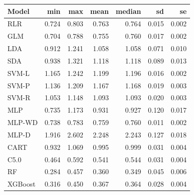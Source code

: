 \documentclass[
]{article}
\newenvironment{Shaded}{\begin{snugshade}}{\end{snugshade}}
\newcommand{\AttributeTok}[1]{\textcolor[rgb]{0.77,0.63,0.00}{#1}}
\newcommand{\DecValTok}[1]{\textcolor[rgb]{0.00,0.00,0.81}{#1}}
\newcommand{\FunctionTok}[1]{\textcolor[rgb]{0.00,0.00,0.00}{#1}}
\newcommand{\NormalTok}[1]{#1}
\newcommand{\OtherTok}[1]{\textcolor[rgb]{0.56,0.35,0.01}{#1}}
\newcommand{\SpecialCharTok}[1]{\textcolor[rgb]{0.00,0.00,0.00}{#1}}
\newcommand{\StringTok}[1]{\textcolor[rgb]{0.31,0.60,0.02}{#1}}
\begin{document}
\begin{Shaded}
\end{Shaded}

\begin{longtable}[]{@{}lrrrrrr@{}}
\toprule()
Model & min & max & mean & median & sd & se \\
\midrule()
\endhead
RLR & 0.724 & 0.803 & 0.763 & 0.764 & 0.015 & 0.002 \\
GLM & 0.704 & 0.788 & 0.755 & 0.760 & 0.017 & 0.002 \\
LDA & 0.912 & 1.241 & 1.058 & 1.058 & 0.071 & 0.010 \\
SDA & 0.938 & 1.321 & 1.118 & 1.118 & 0.089 & 0.013 \\
SVM-L & 1.165 & 1.242 & 1.199 & 1.196 & 0.016 & 0.002 \\
SVM-P & 1.136 & 1.209 & 1.167 & 1.168 & 0.019 & 0.003 \\
SVM-R & 1.053 & 1.148 & 1.093 & 1.093 & 0.020 & 0.003 \\
MLP & 0.735 & 1.173 & 0.931 & 0.927 & 0.120 & 0.017 \\
MLP-WD & 0.738 & 0.783 & 0.759 & 0.760 & 0.011 & 0.002 \\
MLP-D & 1.916 & 2.602 & 2.248 & 2.243 & 0.127 & 0.018 \\
CART & 0.932 & 1.069 & 0.995 & 0.999 & 0.031 & 0.004 \\
C5.0 & 0.464 & 0.592 & 0.541 & 0.544 & 0.031 & 0.004 \\
RF & 0.284 & 0.457 & 0.360 & 0.349 & 0.045 & 0.006 \\
XGBoost & 0.316 & 0.450 & 0.367 & 0.364 & 0.028 & 0.004 \\
\bottomrule()
\end{longtable}
\end{document}
